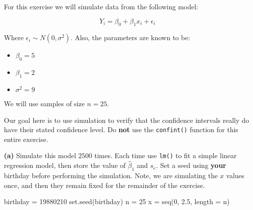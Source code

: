\documentclass[
]{article}
\newenvironment{Shaded}{\begin{snugshade}}{\end{snugshade}}
\newcommand{\AttributeTok}[1]{\textcolor[rgb]{0.77,0.63,0.00}{#1}}
\newcommand{\DecValTok}[1]{\textcolor[rgb]{0.00,0.00,0.81}{#1}}
\newcommand{\FloatTok}[1]{\textcolor[rgb]{0.00,0.00,0.81}{#1}}
\newcommand{\FunctionTok}[1]{\textcolor[rgb]{0.00,0.00,0.00}{#1}}
\newcommand{\NormalTok}[1]{#1}
\newcommand{\OtherTok}[1]{\textcolor[rgb]{0.56,0.35,0.01}{#1}}
\providecommand{\tightlist}{%
  \setlength{\itemsep}{0pt}\setlength{\parskip}{0pt}}
\begin{document}
For this exercise we will simulate data from the following model:

\[
Y_i = \beta_0 + \beta_1 x_i + \epsilon_i
\]

Where \(\epsilon_i \sim N(0, \sigma^2).\) Also, the parameters are known
to be:

\begin{itemize}
\tightlist
\item
  \(\beta_0 = 5\)
\item
  \(\beta_1 = 2\)
\item
  \(\sigma^2 = 9\)
\end{itemize}

We will use samples of size \(n = 25\).

Our goal here is to use simulation to verify that the confidence
intervals really do have their stated confidence level. Do \textbf{not}
use the \texttt{confint()} function for this entire exercise.

\textbf{(a)} Simulate this model \(2500\) times. Each time use
\texttt{lm()} to fit a simple linear regression model, then store the
value of \(\hat{\beta}_1\) and \(s_e\). Set a seed using \textbf{your}
birthday before performing the simulation. Note, we are simulating the
\(x\) values once, and then they remain fixed for the remainder of the
exercise.

\begin{Shaded}
\begin{Highlighting}[]
\NormalTok{birthday }\OtherTok{=} \DecValTok{19880210}
\FunctionTok{set.seed}\NormalTok{(birthday)}
\NormalTok{n }\OtherTok{=} \DecValTok{25}
\NormalTok{x }\OtherTok{=} \FunctionTok{seq}\NormalTok{(}\DecValTok{0}\NormalTok{, }\FloatTok{2.5}\NormalTok{, }\AttributeTok{length =}\NormalTok{ n)}
\end{Highlighting}
\end{Shaded}
\end{document}
